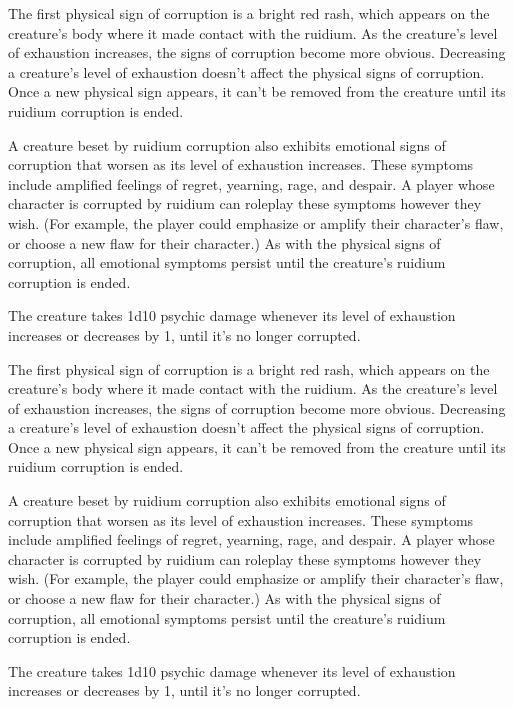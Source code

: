 \documentclass[10pt,a4paper,twoside,fancy,bg=print,twocolumn,openany,nodeprecatedcode]{dndarticle}
\begin{document}
The first physical sign of corruption is a bright red rash, which appears on the creature's body where it made contact with the ruidium. As the creature's level of exhaustion increases, the signs of corruption become more obvious. Decreasing a creature's level of exhaustion doesn't affect the physical signs of corruption. Once a new physical sign appears, it can't be removed from the creature until its ruidium corruption is ended.

A creature beset by ruidium corruption also exhibits emotional signs of corruption that worsen as its level of exhaustion increases. These symptoms include amplified feelings of regret, yearning, rage, and despair. A player whose character is corrupted by ruidium can roleplay these symptoms however they wish. (For example, the player could emphasize or amplify their character's flaw, or choose a new flaw for their character.) As with the physical signs of corruption, all emotional symptoms persist until the creature's ruidium corruption is ended.

The creature takes 1d10 psychic damage whenever its level of exhaustion increases or decreases by 1, until it's no longer corrupted.

The first physical sign of corruption is a bright red rash, which appears on the creature's body where it made contact with the ruidium. As the creature's level of exhaustion increases, the signs of corruption become more obvious. Decreasing a creature's level of exhaustion doesn't affect the physical signs of corruption. Once a new physical sign appears, it can't be removed from the creature until its ruidium corruption is ended.

A creature beset by ruidium corruption also exhibits emotional signs of corruption that worsen as its level of exhaustion increases. These symptoms include amplified feelings of regret, yearning, rage, and despair. A player whose character is corrupted by ruidium can roleplay these symptoms however they wish. (For example, the player could emphasize or amplify their character's flaw, or choose a new flaw for their character.) As with the physical signs of corruption, all emotional symptoms persist until the creature's ruidium corruption is ended.

The creature takes 1d10 psychic damage whenever its level of exhaustion increases or decreases by 1, until it's no longer corrupted.

\vfill
\end{document}
